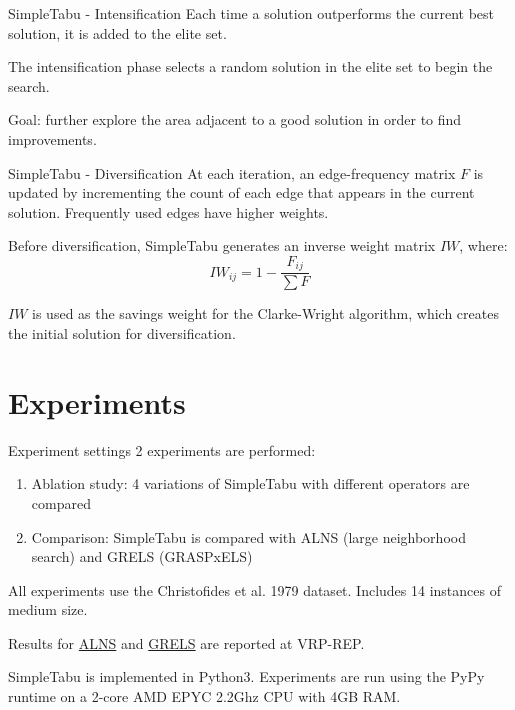 \documentclass[9pt]{beamer}
\begin{document}
\begin{frame}{SimpleTabu - Intensification}
Each time a solution outperforms the current best solution, it is added to the elite set.

The intensification phase selects a random solution in the elite set to begin the search.

Goal: further explore the area adjacent to a good solution in order to find improvements.
\end{frame}

\begin{frame}{SimpleTabu - Diversification}
At each iteration, an edge-frequency matrix $F$ is updated by incrementing the count of each edge that appears in the current solution. Frequently used edges have higher weights.

Before diversification, SimpleTabu generates an inverse weight matrix $IW$, where:
\begin{equation*}
    IW_{ij} = 1 - \frac{F_{ij}}{\sum F}
\end{equation*}

$IW$ is used as the savings weight for the Clarke-Wright algorithm, which creates the initial solution for diversification.

\end{frame}

\section{Experiments}
\begin{frame}{Experiment settings}
2 experiments are performed:
\begin{enumerate}
    \item Ablation study: 4 variations of SimpleTabu with different operators are compared
    \item Comparison: SimpleTabu is compared with ALNS (large neighborhood search) and GRELS (GRASPxELS)
\end{enumerate}

All experiments use the Christofides et al. 1979 dataset. Includes 14 instances of medium size.

Results for \href{http://www.vrp-rep.org/references/item/pisinger-and-ropke-2007.html}{ALNS} and \href{http://www.vrp-rep.org/references/item/prins-2009.html}{GRELS} are reported at VRP-REP.

SimpleTabu is implemented in Python3. Experiments are run using the PyPy \cite{rigo2006pypy} runtime on a 2-core AMD EPYC 2.2Ghz CPU with 4GB RAM.
\end{frame}
\end{document}
